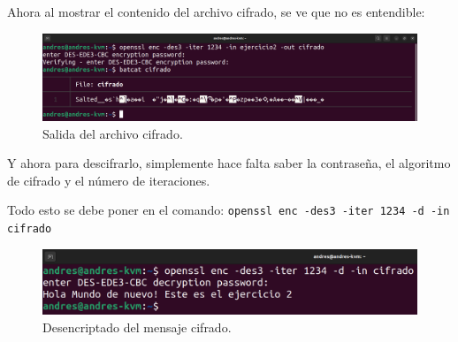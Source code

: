 \documentclass{article}
\begin{document}
\bigskip

Ahora al mostrar el contenido del archivo cifrado, se ve que no es entendible:

\begin{figure}[H]
    \includegraphics[width=\textwidth]{imagenes/Captura desde 2022-10-19 17-44-49.png}
    \caption{Salida del archivo cifrado.}
\end{figure}


Y ahora para descifrarlo, simplemente hace falta saber la contraseña, el algoritmo de cifrado y el número de iteraciones. 

\bigskip

Todo esto se debe poner en el comando: \verb|openssl enc -des3 -iter 1234 -d -in cifrado|

\begin{figure}[H]
    \includegraphics[width=\textwidth]{imagenes/Captura desde 2022-10-19 17-54-02.png}
    \caption{Desencriptado del mensaje cifrado.}
\end{figure}
\end{document}
